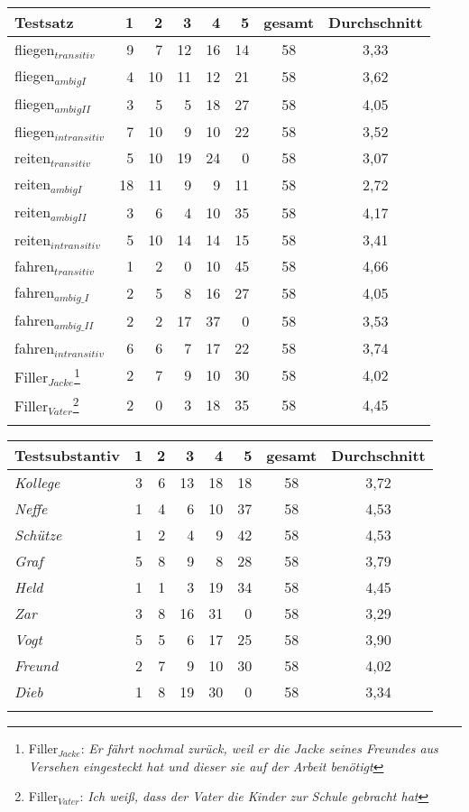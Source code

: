 \begin{table}
\begin{tabular}{lrrrrrcc}
\lsptoprule
Testsatz &	1	&2&	3&	4&	5& gesamt&	Durchschnitt\\
\midrule
fliegen$_{transitiv}$ &	9	&7&	12&	16&	14&58	&3,33\\
fliegen$_{ambig I}$	&4	&10&	11	&12	&21&58	&3,62\\
fliegen$_{ambig II}$	&3	&5	&5&	18	&27&58&	4,05\\
fliegen$_{intransitiv}$&7&	10	&9	&10&	22&58	&3,52\\
\midrule
reiten$_{transitiv}$&	5	&10	&19	&24	&0&58&	3,07\\
reiten$_{ambig I}$&	18	&11	&9&	9	&11&58&	2,72\\
reiten$_{ambig II}$&	3	&6	&4	&10&	35&58	&4,17\\
reiten$_{intransitiv}$&	5	&10	&14	&14	&15&58	&3,41\\
\midrule
fahren$_{transitiv}$&	1	&2	&0	&10	&45&58	&4,66\\
fahren$_{ambig\_I}$	&2	&5	&8&	16	&27&58&	4,05\\
fahren$_{ambig\_II}$	&2	&2	&17&	37&	0&58	&3,53\\
fahren$_{intransitiv}$&	6	&6	&7	&17&	22&58	&3,74\\
\midrule
Filler$_{Jacke}$\footnote{Filler$_{Jacke}$: \textit{Er fährt nochmal zurück, weil er die Jacke seines Freundes aus Versehen eingesteckt hat und dieser sie auf der Arbeit benötigt} } &	2	&7&	9	&10&	30&58	&4,02\\
Filler$_{Vater}$\footnote{Filler$_{Vater}$: \textit{Ich weiß, dass der Vater die Kinder zur Schule gebracht hat}} &2	&0	&3&	18&	35&58&	4,45\\
\lspbottomrule 
	\end{tabular}
	\label{plaushaben}		
\end{table}


\begin{table}
\begin{tabular}{lrrrrrcc}
\lsptoprule
Testsubstantiv& 1 &	2	&3&	4&	5	& gesamt& Durchschnitt\\
\midrule
\textit{Kollege}&	3&	6&	13&	18&	18&	58&3,72\\
\textit{Neffe}&	1&	4&	6&	10&	37&58&	4,53\\
\textit{Schütze}&	1&	2&	4&	9&	42&58&	4,53\\
\textit{Graf}&	5&	8&	9&	8&	28&	58&3,79\\
\textit{Held}	&1&	1&	3&	19&	34&	58&4,45\\
\textit{Zar}	&3&	8&	16&	31&	0&	58&3,29\\
\textit{Vogt}	&5&	5&	6&	17&	25&58&	3,90\\
\textit{Freund}	&2&	7&	9&	10&	30&	58&4,02\\
\textit{Dieb}	&1&	8&	19&	30&	0&58&	3,34\\
\lspbottomrule
\end{tabular}
\label{plausubst}		
\end{table}

